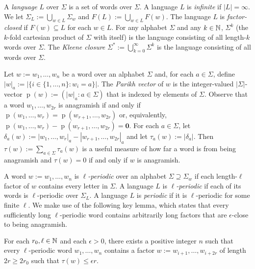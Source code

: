 \documentclass{patmorin}
\DeclareMathOperator{\hist}{p}
\begin{document}
A \emph{language} $L$ over $\Sigma$ is a set of words over $\Sigma$.  A language $L$ is \emph{infinite} if $|L|=\infty$.  We let $\Sigma_L:=\bigcup_{w\in L}\Sigma_w$ and $F(L):=\bigcup_{w\in L}F(w)$.  The language $L$ is \emph{factor-closed} if $F(w)\subseteq L$ for each $w\in L$.  For any alphabet $\Sigma$ and any $k\in\mathbb{N}$, $\Sigma^k$ (the $k$-fold cartesian product of $\Sigma$ with itself) is the language consisting of all length-$k$ words over $\Sigma$.  The \emph{Kleene closure} $\Sigma^*:=\bigcup_{k=0}^\infty \Sigma^k$ is the language consisting of all words over $\Sigma$.


Let $w:=w_1,\ldots,w_n$ be a word over an alphabet $\Sigma$ and, for each $a\in \Sigma$, define $|w|_a:=|\{i\in\{1,\ldots,n\}:w_i=a\}|$.  The \emph{Parikh vector} of $w$ is the integer-valued $|\Sigma|$-vector $\hist(w):=(|w|_{a}:a\in\Sigma)$ that is indexed by elements of $\Sigma$.  Observe that a word $w_1,\ldots,w_{2r}$ is anagramish if and only if $\hist(w_1,\ldots,w_r)=\hist(w_{r+1},\ldots,w_{2r})$ or, equivalently, $\hist(w_1,\ldots,w_r)-\hist(w_{r+1},\ldots,w_{2r})=\boldsymbol{0}$.
For each $a\in\Sigma$, let $\delta_a(w):=|w_1,\ldots,w_r|_{a}-|w_{r+1},\ldots,w_{2r}|_{a}$ and let $\tau_a(w):=|\delta_a|$.
Then $\tau(w):=\sum_{a\in\Sigma}\tau_a(w)$ is a useful measure of how far a word is from being anagramish and $\tau(w)=0$ if and only if $w$ is anagramish.

A word $w:=w_1,\ldots,w_n$ is \emph{$\ell$-periodic} over an alphabet $\Sigma\supseteq\Sigma_w$ if each length-$\ell$ factor of $w$ contains every letter in $\Sigma$.  A language $L$ is \emph{$\ell$-periodic}  if each of its words is $\ell$-periodic over $\Sigma_L$.  A language $L$ is \emph{periodic} if it is $\ell$-periodic for some finite $\ell$.  We make use of the following key lemma, which states that every sufficiently long $\ell$-periodic word contains arbitrarily long factors that are $\epsilon$-close to being anagramish.

\begin{lem}\label{near_anagram_fourier}
    For each $r_0,\ell\in\mathbb{N}$ and each $\epsilon>0$, there exists a positive integer $n$ such that every $\ell$-periodic word $w_1,\ldots,w_n$ contains a factor $w:=w_{i+1},\ldots,w_{i+2r}$ of length $2r \ge 2r_0$ such that $\tau(w)\le \epsilon r$.
\end{lem}
\end{document}
